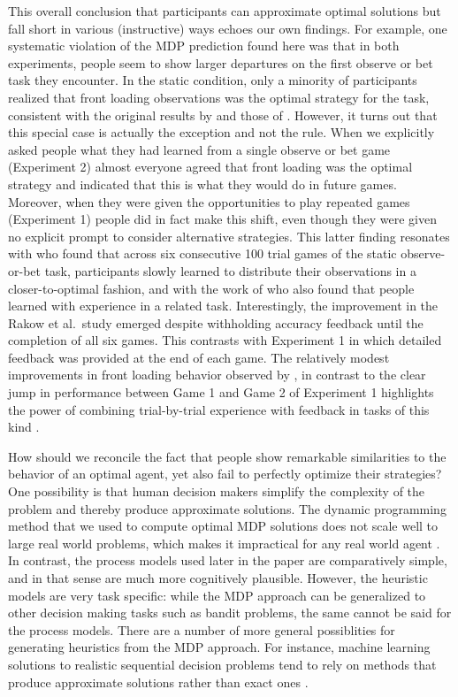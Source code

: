 \documentclass[authoryear]{elsarticle}
\begin{document}
This overall conclusion that participants can approximate optimal solutions but fall short in various (instructive) ways echoes our own findings. For example, one  systematic violation of the MDP prediction found here was that  in both experiments, people seem to show larger departures on the first observe or bet task they encounter. In the static condition, only a minority of participants realized that front loading observations  was the optimal strategy for the task, consistent with the original results by \citet{tversky_information_1966} and those of \citet{rakow_role_2010}. However, it turns out that this special  case is actually the exception and not the rule. When we explicitly asked people what they had learned from a single observe or bet game (Experiment 2) almost everyone agreed that front loading was the optimal strategy and indicated that this is what they would do in future games. Moreover, when they were given the opportunities to play repeated games (Experiment 1) people did in fact make this shift, even though they were given no explicit prompt to consider alternative strategies. This latter finding resonates with \citet{rakow_role_2010} who found that across six consecutive 100 trial games of the static observe-or-bet task, participants slowly learned to distribute their observations in a closer-to-optimal fashion, and with the work of \citep{sang_learning_2011} who also found that people learned with experience in a related task. Interestingly, the improvement in the Rakow et al.\ study emerged despite withholding accuracy feedback until the completion of all six games. This contrasts with Experiment 1 in which detailed feedback was provided at the end of each game. The relatively modest improvements  in front loading behavior observed by \citet{rakow_role_2010}, in contrast to the clear jump in performance between Game 1 and Game 2 of Experiment 1 highlights the power of combining trial-by-trial experience with feedback in tasks of this kind \citep{newell_role_2007}.

How should we reconcile the fact that people show remarkable similarities to the behavior of an optimal agent, yet also fail to perfectly optimize their strategies? One possibility is that  human decision makers simplify the complexity of the problem and thereby produce approximate solutions. The dynamic programming method that we used to compute optimal MDP solutions does not scale well to large real world problems, which makes it impractical for any real world agent \citep[see, e.g.,][for discussion]{van_rooij_rational_INPRESS}. In contrast, the process models used later in the paper are comparatively simple, and in that sense are much more cognitively plausible. However, the heuristic models are very task specific: while the MDP approach can be generalized to other decision making tasks such as bandit problems, the same cannot be said for the  process models. There are a number of more general possiblities for generating heuristics from the MDP approach. For instance, machine learning solutions to realistic sequential decision problems tend to rely on methods that  produce approximate solutions rather than exact ones \citep[e.g.,][]{thrun_monte_1999_fixed,pineau_point-based_2003,silver_monte-carlo_2010}.
\end{document}
